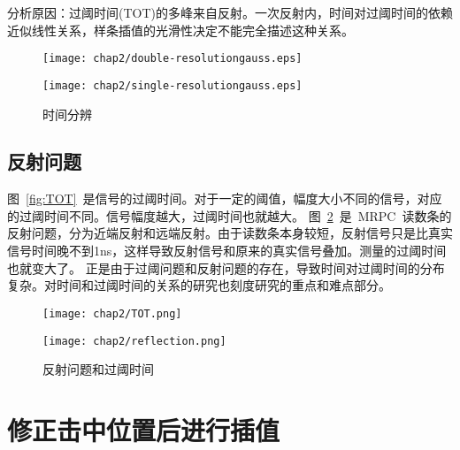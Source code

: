 分析原因：过阈时间(TOT)的多峰来自反射。一次反射内，时间对过阈时间的依赖近似线性关系，样条插值的光滑性决定不能完全描述这种关系。
\begin{figure}[!h]
\begin{minipage}[!h]{0.5\linewidth}
\texttt{[image: chap2/double-resolutiongauss.eps]}
\label{fig:double-resolutiongauss}
\end{minipage}%
\hfill
\begin{minipage}[!h]{0.5\linewidth}
\texttt{[image: chap2/single-resolutiongauss.eps]}
\label{fig:single-resolutiongauss}
\end{minipage}
\caption{时间分辨}
\end{figure}

\subsection{反射问题}


图~\ref{fig:TOT}~是信号的过阈时间。对于一定的阈值，幅度大小不同的信号，对应的过阈时间不同。信号幅度越大，过阈时间也就越大。
图~\ref{fig:reflection}~是~MRPC~读数条的反射问题，分为近端反射和远端反射。由于读数条本身较短，反射信号只是比真实信号时间晚不到1ns，这样导致反射信号和原来的真实信号叠加。测量的过阈时间也就变大了。
正是由于过阈问题和反射问题的存在，导致时间对过阈时间的分布复杂。对时间和过阈时间的关系的研究也刻度研究的重点和难点部分。

\begin{figure}[!h]
\begin{minipage}[!h]{0.5\linewidth}
\texttt{[image: chap2/TOT.png]}
\label{fig:TOT}
\end{minipage}
\hfill
\begin{minipage}[!h]{0.5\linewidth}
\texttt{[image: chap2/reflection.png]}
\label{fig:reflection}
\end{minipage}%
\caption{反射问题和过阈时间}
\end{figure}


\section{修正击中位置后进行插值}


